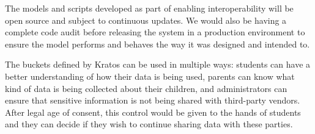 \documentclass{article}
\begin{document}
\bigbreak
The models and scripts developed as part of enabling interoperability will be open source and subject to continuous updates. We would also be having a complete code audit before releasing the system in a production environment to ensure the model performs and behaves the way it was designed and intended to.

\bigbreak
The buckets defined by Kratos can be used in multiple ways: students can have a better understanding of how their data is being used, parents can know what kind of data is being collected about their children, and administrators can ensure that sensitive information is not being shared with third-party vendors. After legal age of consent, this control would be given to the hands of students and they can decide if they wish to continue sharing data with these parties.
\end{document}

